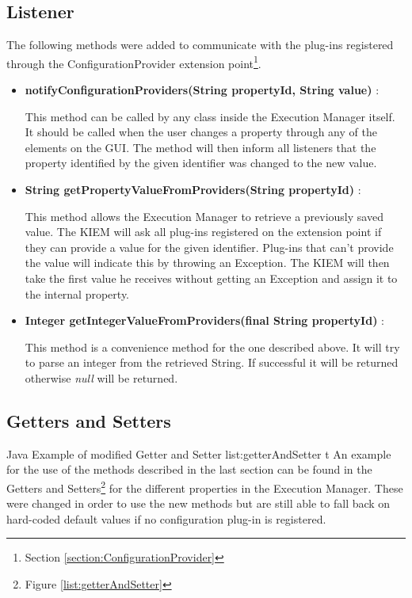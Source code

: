 \subsection{Listener}
The following methods were added to communicate with the plug-ins registered through
the ConfigurationProvider extension point\footnote{Section \ref{section:ConfigurationProvider}}.
\begin{itemize}
 \item \textbf{notifyConfigurationProviders(String propertyId, String value)} : 

This method can be called by any class
inside the Execution Manager itself. It should be called when the user changes a property through any of
the elements on the \ac{GUI}. The method will then inform all listeners that the property identified by the
given identifier was changed to the new value.
 \item \textbf{String getPropertyValueFromProviders(String propertyId)} : 

This method allows the Execution Manager to
retrieve a previously saved value. The \ac{KIEM} will ask all plug-ins registered on the extension point if they
can provide a value for the given identifier. Plug-ins that can't provide the value will indicate this by throwing
an Exception. The \ac{KIEM} will then take the first value he receives without getting an Exception and assign it
to the internal property.
 \item \textbf{Integer getIntegerValueFromProviders(final String propertyId)} : 

This method is a convenience method for the one described above. 
It will try to parse an integer from the retrieved String. If successful it will be returned otherwise
\textit{null} will be returned.
\end{itemize}

\subsection{Getters and Setters}
\listingjava
{}
{Java}
{Example of modified Getter and Setter}
{list:getterAndSetter}
{t}
An example for the use of the methods described in the last section can be found in the 
Getters and Setters\footnote{Figure \ref{list:getterAndSetter}} for
the different properties in the Execution Manager. 
These were changed in order to use the new methods but are
still able to fall back on hard-coded default values if no configuration plug-in is registered.


